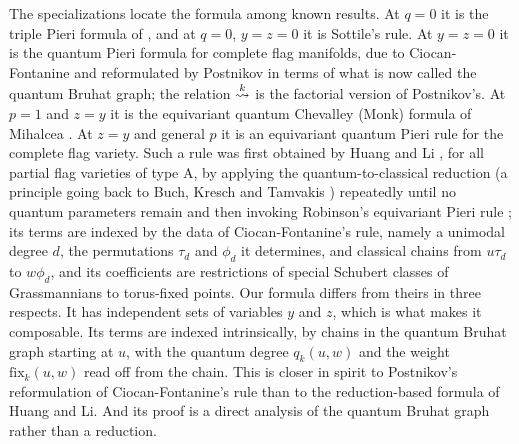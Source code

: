 \documentclass{amsart}
\theoremstyle{definition}
\theoremstyle{remark}
\numberwithin{equation}{section}
\newcommand{\xrightsquigarrow}[2][]{%
	\mathrel{\mathop{\rightsquigarrow}\limits^{\scriptstyle #2}%
	\ifx\hfuzz#1\hfuzz\else_{\scriptstyle #1}\fi}%
}
\newcommand{\tom}[1]{\ensuremath{\xrightsquigarrow{#1}}}
\newcommand{\fx}{\mathrm{fix}}
\begin{document}
\begin{enumerate}
The specializations locate the formula among known results. At $q=0$ it is the triple Pieri formula of \cite{samuelmolev}, and at $q=0$, $y=z=0$ it is Sottile's rule. At $y=z=0$ it is the quantum Pieri formula for complete flag manifolds, due to Ciocan-Fontanine \cite{ciocan1999partial} and reformulated by Postnikov \cite{postnikov1999quantum} in terms of what is now called the quantum Bruhat graph; the relation $\tom{k}$ is the factorial version of Postnikov's. At $p=1$ and $z=y$ it is the equivariant quantum Chevalley (Monk) formula of Mihalcea \cite{mihalcea2007equivariant}. At $z=y$ and general $p$ it is an equivariant quantum Pieri rule for the complete flag variety. Such a rule was first obtained by Huang and Li \cite[Theorem~3.10]{huang2015equivariant}, for all partial flag varieties of type A, by applying the quantum-to-classical reduction (a principle going back to Buch, Kresch and Tamvakis \cite{buch2003gwgrass}) repeatedly until no quantum parameters remain and then invoking Robinson's equivariant Pieri rule \cite{robinsonpieri}; its terms are indexed by the data of Ciocan-Fontanine's rule, namely a unimodal degree $d$, the permutations $\tau_d$ and $\phi_d$ it determines, and classical chains from $u\tau_d$ to $w\phi_d$, and its coefficients are restrictions of special Schubert classes of Grassmannians to torus-fixed points. Our formula differs from theirs in three respects. It has independent sets of variables $y$ and $z$, which is what makes it composable. Its terms are indexed intrinsically, by chains in the quantum Bruhat graph starting at $u$, with the quantum degree $q_k(u,w)$ and the weight $\fx_k(u,w)$ read off from the chain. This is closer in spirit to Postnikov's reformulation of Ciocan-Fontanine's rule than to the reduction-based formula of Huang and Li. And its proof is a direct analysis of the quantum Bruhat graph rather than a reduction.


\end{enumerate}
\end{document}
